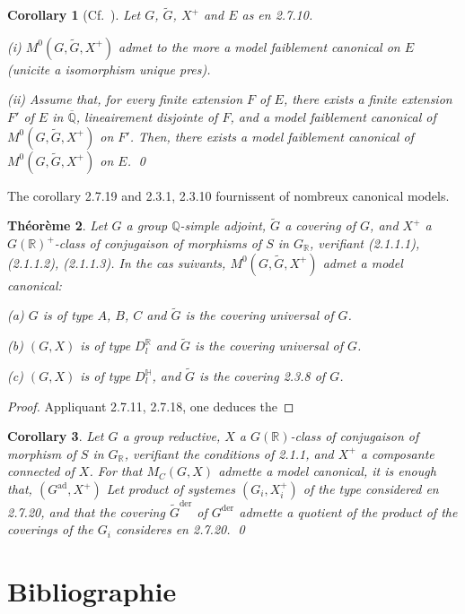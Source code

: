 \documentclass[12pt,a4paper]{article}
\theoremstyle{plain}
\newtheorem{theorem}{Th\'eor\`eme}[section]
\newtheorem{corollary}[theorem]{Corollary}
\theoremstyle{definition}
\theoremstyle{remark}
\newcommand{\QQ}{\mathbb{Q}}
\newcommand{\RR}{\mathbb{R}}
\begin{document}
\begin{corollary}[Cf.~{\cite[5.5, 5.10, 5.10.2]{deligne71}}]
Let $G$, $\tilde{G}$, $X^+$ and $E$ as en 2.7.10.

\textup{(i)} $M^0(G,\tilde{G},X^+)$ admet to the more a model faiblement canonical on $E$ (unicite a isomorphism unique pres).

\textup{(ii)} Assume that, for every finite extension $F$ of $E$, there exists a finite extension $F'$ of $E$ in $\overline{\QQ}$, lineairement disjointe of $F$, and a model faiblement canonical of $M^0(G,\tilde{G},X^+)$ on $F'$. Then, there exists a model faiblement canonical of $M^0(G,\tilde{G},X^+)$ on $E$.
\qed
\end{corollary}

The corollary 2.7.19 and 2.3.1, 2.3.10 fournissent of nombreux canonical models.

\begin{theorem}
Let $G$ a group $\QQ$-simple adjoint, $\tilde{G}$ a covering of $G$, and $X^+$ a $G(\RR)^+$-class of conjugaison of morphisms of $S$ in $G_{\RR}$, verifiant (2.1.1.1), (2.1.1.2), (2.1.1.3). In the cas suivants, $M^0(G,\tilde{G},X^+)$ admet a model canonical:

\textup{(a)} $G$ is of type $A$, $B$, $C$ and $\tilde{G}$ is the covering universal of $G$.

\textup{(b)} $(G,X)$ is of type $D_l^{\RR}$ and $\tilde{G}$ is the covering universal of $G$.

\textup{(c)} $(G,X)$ is of type $D_l^{\mathbb{H}}$, and $\tilde{G}$ is the covering 2.3.8 of $G$.
\end{theorem}

\begin{proof}
Appliquant 2.7.11, 2.7.18, one deduces the
\end{proof}

\begin{corollary}
Let $G$ a group reductive, $X$ a $G(\RR)$-class of conjugaison of morphism of $S$ in $G_{\RR}$, verifiant the conditions of 2.1.1, and $X^+$ a composante connected of $X$. For that $M_C(G,X)$ admette a model canonical, it is enough that, $(G^{\text{ad}}, X^+)$ Let product of systemes $(G_i, X_i^+)$ of the type considered en 2.7.20, and that the covering $\tilde{G}^{\text{der}}$ of $G^{\text{der}}$ admette a quotient of the product of the coverings of the $G_i$ consideres en 2.7.20.
\qed
\end{corollary}

\section*{Bibliographie}
\end{document}
